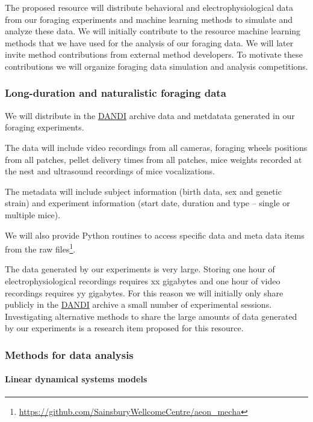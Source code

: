
The proposed resource will distribute behavioral and electrophysiological data
from our foraging experiments and machine learning methods to simulate and analyze
these data. We will initially contribute to the resource machine learning
methods that we have used for the analysis of our foraging data. We will later
invite method contributions from external method developers. To motivate these
contributions we will organize foraging data simulation and analysis
competitions.

\subsubsection{Long-duration and naturalistic foraging data}

We will distribute in the \href{https://dandiarchive.org/}{DANDI} archive data
and metdatata generated in our foraging experiments.

The data will include
video recordings from all cameras,
foraging wheels positions from all patches,
pellet delivery times from all patches,
mice weights recorded at the nest and
ultrasound recordings of mice vocalizations.

The metadata will include
subject information (birth data, sex and genetic strain) and
experiment information (start date, duration and type -- single or multiple
mice).

We will also provide Python routines to access specific data and meta data
items from the raw
files\footnote{\url{https://github.com/SainsburyWellcomeCentre/aeon_mecha}}.

The data generated by our experiments is very large. Storing one hour of
electrophysiological recordings requires xx gigabytes and one hour of video
recordings requires yy gigabytes. For this reason we will initially only share
publicly in the \href{https://dandiarchive.org/}{DANDI} archive a small number
of experimental sessions.
%
Investigating alternative methods to share the large amounts of data generated
by our experiments is a research item proposed for this resource.

\subsubsection{Methods for data analysis}

\paragraph{Linear dynamical systems models}

